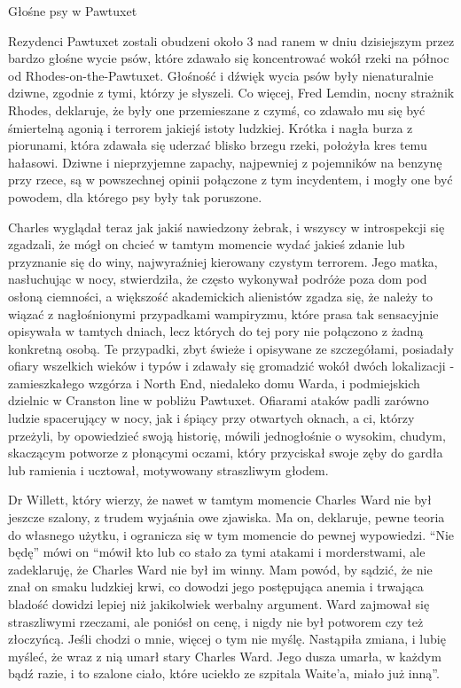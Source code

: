 \begin{displayquote}
\begin{center}
Głośne psy w Pawtuxet
\end{center}

Rezydenci Pawtuxet zostali obudzeni około 3 nad ranem w dniu dzisiejszym przez bardzo głośne wycie psów, które zdawało się koncentrować wokół rzeki na północ od Rhodes-on-the-Pawtuxet. Głośność i dźwięk wycia psów były nienaturalnie dziwne, zgodnie z tymi, którzy je słyszeli. Co więcej, Fred Lemdin, nocny strażnik Rhodes, deklaruje, że były one przemieszane z czymś, co zdawało mu się być śmiertelną agonią i terrorem jakiejś istoty ludzkiej. Krótka i nagła burza z piorunami, która zdawała się uderzać blisko brzegu rzeki, położyła kres temu hałasowi. Dziwne i nieprzyjemne zapachy, najpewniej z pojemników na benzynę przy rzece, są w powszechnej opinii połączone z tym incydentem, i mogły one być powodem, dla którego psy były tak poruszone.

\end{displayquote}

Charles wyglądał teraz jak jakiś nawiedzony żebrak, i wszyscy w introspekcji się zgadzali, że mógł on chcieć w tamtym momencie wydać jakieś zdanie lub przyznanie się do winy, najwyraźniej kierowany czystym terrorem. Jego matka, nasłuchując w nocy, stwierdziła, że często wykonywał podróże poza dom pod osłoną ciemności, a większość akademickich alienistów zgadza się, że należy to wiązać z nagłośnionymi przypadkami wampiryzmu, które prasa tak sensacyjnie opisywała w tamtych dniach, lecz których do tej pory nie połączono z żadną konkretną osobą. Te przypadki, zbyt świeże i opisywane ze szczegółami, posiadały ofiary wszelkich wieków i typów i zdawały się gromadzić wokół dwóch lokalizacji - zamieszkałego wzgórza i North End, niedaleko domu Warda, i podmiejskich dzielnic w Cranston line w pobliżu Pawtuxet. Ofiarami ataków padli zarówno ludzie spacerujący w nocy, jak i śpiący przy otwartych oknach, a ci, którzy przeżyli, by opowiedzieć swoją historię, mówili jednogłośnie o wysokim, chudym, skaczącym potworze z płonącymi oczami, który przyciskał swoje zęby do gardła lub ramienia i ucztował, motywowany straszliwym głodem.  

Dr Willett, który wierzy, że nawet w tamtym momencie Charles Ward nie był jeszcze szalony, z trudem wyjaśnia owe zjawiska. Ma on, deklaruje, pewne teoria do własnego użytku, i ogranicza się w tym momencie do pewnej wypowiedzi. ``Nie będę'' mówi on ``mówił kto lub co stało za tymi atakami i morderstwami, ale zadeklaruję, że Charles Ward nie był im winny. Mam powód, by sądzić, że nie znał on smaku ludzkiej krwi, co dowodzi jego postępująca anemia i trwająca bladość dowidzi lepiej niż jakikolwiek werbalny argument. Ward zajmował się straszliwymi rzeczami, ale poniósł on cenę, i nigdy nie był potworem czy też złoczyńcą. Jeśli chodzi o mnie, więcej o tym nie myślę. Nastąpiła zmiana, i lubię myśleć, że wraz z nią umarł stary Charles Ward. Jego dusza umarła, w każdym bądź razie, i to szalone ciało, które uciekło ze szpitala Waite'a, miało już inną''.

